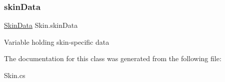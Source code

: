 \subsubsection{\texorpdfstring{skinData}{skinData}}
{\footnotesize\ttfamily \mbox{\hyperlink{class_skin_data}{Skin\+Data}} Skin.\+skin\+Data}



Variable holding skin-\/specific data 



The documentation for this class was generated from the following file\+:\begin{DoxyCompactItemize}
\item 
Skin.\+cs\end{DoxyCompactItemize}
